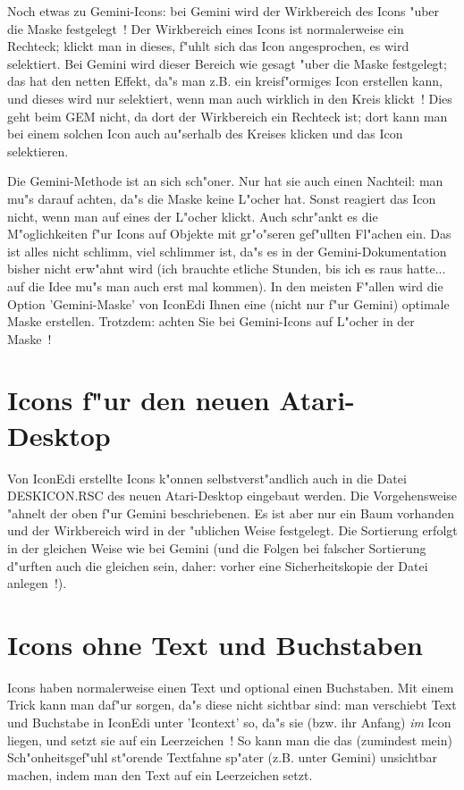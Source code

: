 Noch etwas zu Gemini-Icons: bei Gemini wird der Wirkbereich des
Icons "uber die Maske festgelegt~! Der Wirkbereich eines Icons
ist normalerweise ein Rechteck; klickt man in dieses, f"uhlt sich
das Icon angesprochen, es wird selektiert. Bei Gemini wird dieser 
Bereich wie gesagt "uber die Maske festgelegt; das hat den netten
Effekt, da"s man z.B. ein kreisf"ormiges Icon erstellen kann, und
dieses wird nur selektiert, wenn man auch wirklich in den Kreis
klickt~! Dies geht beim GEM nicht, da dort der Wirkbereich ein 
Rechteck ist; dort kann man bei einem solchen Icon auch au"serhalb
des Kreises klicken und das Icon selektieren.

Die Gemini-Methode ist an sich sch"oner. Nur hat sie auch einen 
Nachteil: man mu"s darauf achten, da"s die Maske keine L"ocher hat.
Sonst reagiert das Icon nicht, wenn man auf eines der L"ocher klickt.
Auch schr"ankt es die M"oglichkeiten f"ur Icons auf Objekte mit
gr"o"seren gef"ullten Fl"achen ein. Das ist alles nicht schlimm, viel
schlimmer ist, da"s es in der Gemini-Dokumentation bisher nicht 
erw"ahnt wird (ich brauchte etliche Stunden, bis ich es raus hatte... 
auf die Idee mu"s man auch erst mal kommen). In den meisten F"allen
wird die Option 'Gemini-Maske' von IconEdi Ihnen eine (nicht nur
f"ur Gemini) optimale Maske erstellen. Trotzdem: achten Sie bei
Gemini-Icons auf L"ocher in der Maske~!

\section{Icons f"ur den neuen Atari-Desktop} 
Von IconEdi erstellte Icons k"onnen selbstverst"andlich auch
in die Datei DESKICON.RSC des neuen Atari-Desktop eingebaut werden.
Die Vorgehensweise "ahnelt der oben f"ur Gemini beschriebenen.
Es ist aber nur ein Baum vorhanden und der Wirkbereich wird
in der "ublichen Weise festgelegt. Die Sortierung erfolgt
in der gleichen Weise wie bei Gemini (und die Folgen bei falscher
Sortierung d"urften auch die gleichen sein, daher: vorher eine
Sicherheitskopie der Datei anlegen~!).

\section{Icons ohne Text und Buchstaben} 
Icons haben normalerweise einen Text und optional einen Buchstaben.
Mit einem Trick kann man daf"ur sorgen, da"s diese nicht
sichtbar sind: man verschiebt Text und Buchstabe in IconEdi 
unter 'Icontext' so,
da"s sie (bzw. ihr Anfang) {\sl im} Icon liegen, und setzt 
sie auf ein Leerzeichen~! So kann man die 
das (zumindest mein) Sch"onheitsgef"uhl st"orende Textfahne sp"ater
(z.B. unter Gemini) unsichtbar machen, indem man den Text auf
ein Leerzeichen setzt.

